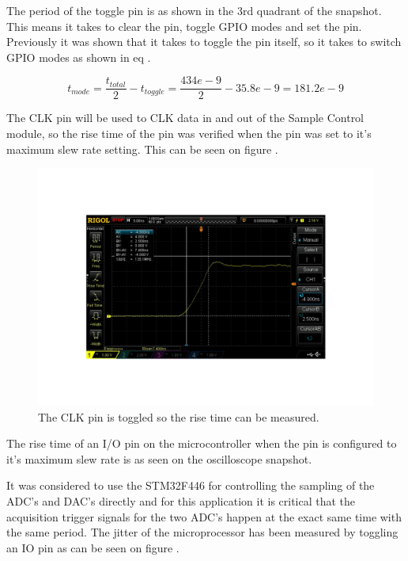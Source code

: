 The period of the toggle pin is  as shown in the 3rd quadrant of the snapshot. This means it takes  to clear the pin, toggle GPIO modes and set the pin. Previously it was shown that it takes  to toggle the pin itself, so it takes  to switch GPIO modes as shown in eq .

\begin{equation}\label{eq:App_A_ModeSwitch}
    t_{mode} = \frac{t_{total}}{2} - t_{toggle} = \frac{434e-9}{2} - 35.8e-9 = 181.2e-9 
\end{equation}

The CLK pin will be used to CLK data in and out of the Sample Control module, so the rise time of the pin was verified when the pin was set to it's maximum slew rate setting. This can be seen on figure .

\begin{figure}[H]
    \centering
    \includegraphics[clip, trim=0 100 0 100, width=1\textwidth]{Appendix/Figures/IORiseFallTime.pdf}
    \caption{The CLK pin is toggled so the rise time can be measured.}
    \label{fig:App_A_RiseTime}
\end{figure}

The rise time of an I/O pin on the microcontroller when the pin is configured to it's maximum slew rate is  as seen on the oscilloscope snapshot. 

It was considered to use the STM32F446 for controlling the sampling of the ADC's and DAC's directly and for this application it is critical that the acquisition trigger signals for the two ADC's happen at the exact same time with the same period. The jitter of the microprocessor has been measured by toggling an IO pin as can be seen on figure .

